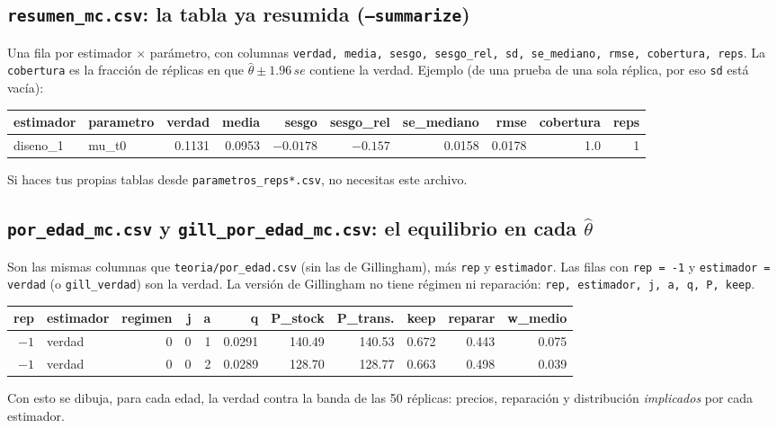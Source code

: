 \documentclass[11pt]{article}
\newcommand{\col}[1]{\texttt{#1}}
\newcommand{\archivo}[1]{\textbf{\texttt{#1}}}
\begin{document}
\subsection{\archivo{resumen\_mc.csv}: la tabla ya resumida (\texttt{--summarize})}

Una fila por estimador $\times$ parámetro, con columnas \col{verdad, media, sesgo, sesgo\_rel,
sd, se\_mediano, rmse, cobertura, reps}. La \col{cobertura} es la fracción de réplicas en que
$\hat\theta\pm1.96\,se$ contiene la verdad. Ejemplo (de una prueba de una sola réplica, por
eso \col{sd} está vacía):
\begin{center}\footnotesize
\begin{adjustbox}{max width=\textwidth}\begin{tabular}{llrrrrrrrr}
\toprule
estimador & parametro & verdad & media & sesgo & sesgo\_rel & se\_mediano & rmse & cobertura & reps\\
\midrule
diseno\_1 & mu\_t0 & 0.1131 & 0.0953 & $-0.0178$ & $-0.157$ & 0.0158 & 0.0178 & 1.0 & 1\\
\bottomrule
\end{tabular}\end{adjustbox}
\end{center}
Si haces tus propias tablas desde \texttt{parametros\_reps*.csv}, no necesitas este archivo.

\subsection{\archivo{por\_edad\_mc.csv} y \archivo{gill\_por\_edad\_mc.csv}: el equilibrio en cada $\hat\theta$}

Son las mismas columnas que \texttt{teoria/por\_edad.csv} (sin las de Gillingham), más
\col{rep} y \col{estimador}. Las filas con \col{rep = -1} y \col{estimador = verdad} (o
\col{gill\_verdad}) son la verdad. La versión de Gillingham no tiene régimen ni reparación:
\col{rep, estimador, j, a, q, P, keep}.

\begin{center}\footnotesize
\begin{adjustbox}{max width=\textwidth}\begin{tabular}{rlrrrrrrrrr}
\toprule
rep & estimador & regimen & j & a & q & P\_stock & P\_trans. & keep & reparar & w\_medio\\
\midrule
$-1$ & verdad & 0 & 0 & 1 & 0.0291 & 140.49 & 140.53 & 0.672 & 0.443 & 0.075\\
$-1$ & verdad & 0 & 0 & 2 & 0.0289 & 128.70 & 128.77 & 0.663 & 0.498 & 0.039\\
\bottomrule
\end{tabular}\end{adjustbox}
\end{center}
Con esto se dibuja, para cada edad, la verdad contra la banda de las 50 réplicas: precios,
reparación y distribución \emph{implicados} por cada estimador.
\end{document}
